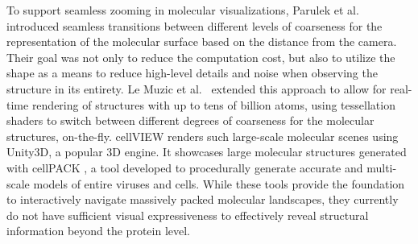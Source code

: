 \documentclass{egpubl}
\begin{document}
	To support seamless zooming in molecular visualizations, Parulek et al.~\cite{parulek2014continuous} introduced seamless transitions between different levels of coarseness for the representation of the molecular surface based on the distance from the camera.
	Their goal was not only to reduce the computation cost, but also to utilize the shape as a means to reduce high-level details and noise when observing the structure in its entirety.
	Le Muzic et al.~\cite{le2014illustrative} extended this approach to allow for real-time rendering of structures with up to tens of billion atoms, using tessellation shaders to switch between different degrees of coarseness for the molecular structures, on-the-fly. 
	cellVIEW \cite{muzic2015cellview} renders such large-scale molecular scenes using Unity3D, a popular 3D engine. 
	It showcases large molecular structures generated with cellPACK \cite{johnson2015cellpack}, a tool developed to procedurally generate accurate and multi-scale models of entire viruses and cells.
	While these tools provide the foundation to interactively navigate massively packed molecular landscapes, they currently do not have sufficient visual expressiveness to effectively reveal structural information beyond the protein level. 
	
\end{document}
